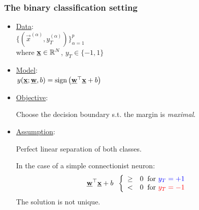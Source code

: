 \begin{frame}\frametitle{The binary classification setting}



\begin{itemize}
	\item \underline{Data}:\\[2mm]
	$
	\Big\{ \left(\vec x^{(\alpha)}, y^{(\alpha)}_{T} \right) \Big\}_{\alpha=1}^{p}\,
	$\\[2mm]
	where $\vec x \in \R^{N}$, $y_T \in \{-1, 1\}$\\

	\item \underline{Model}:\\[2mm]
	$
	y(\vec x; \vec w,b) = \sign \big( \vec w^{\top} \vec x + b \big)
	$
    
    \item \underline{Objective}:
    
    Choose the decision boundary s.t. the margin is \emph{maximal}.
    
    \item \underline{Assumption}:
    
    Perfect linear separation of both classes.
    
    \pause
    
    In the case of a simple connectionist neuron:
    \begin{equation}
    \vec w^{\top} \vec x + b \;\;
    \left \{ \begin{array}{ll}
					\ge& 0 \;\;\text{for } {\color{blue}y_{T} = +1}\\
					<& 0 \;\;\text{for } {\color{red}y_{T} = -1}
				\end{array} \right.  
    \end{equation}
    The solution is not unique.
    
\end{itemize}
    
\end{frame}

